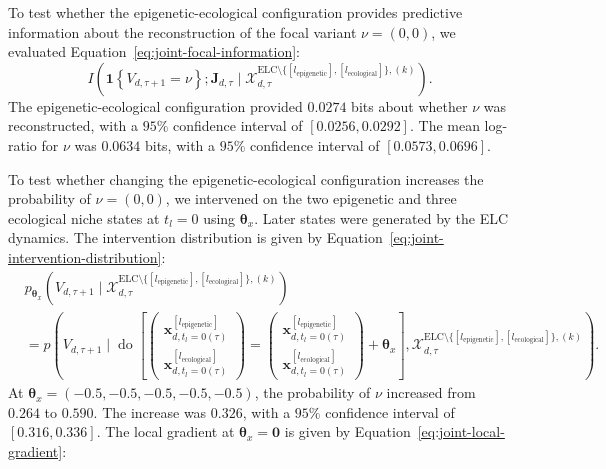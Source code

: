 \documentclass[11pt]{article}
\newcommand{\ELC}{\mathrm{ELC}}
\begin{document}
To test whether the epigenetic-ecological configuration provides predictive information about the reconstruction of the focal variant $\nu=(0,0)$, we evaluated Equation~\ref{eq:joint-focal-information}:
\begin{equation}
I\left(
\mathbf{1}\left\{V_{d,\tau+1}=\nu\right\};
\mathbf{J}_{d,\tau}
\mid
\mathcal{X}^{\ELC\setminus
\{[l_{\mathrm{epigenetic}}],[l_{\mathrm{ecological}}]\},(k)}_{d,\tau}
\right).
\label{eq:joint-focal-information}
\end{equation}
The epigenetic-ecological configuration provided $0.0274$ bits about whether $\nu$ was reconstructed, with a $95\%$ confidence interval of $[0.0256,0.0292]$. The mean log-ratio for $\nu$ was $0.0634$ bits, with a $95\%$ confidence interval of $[0.0573,0.0696]$.

To test whether changing the epigenetic-ecological configuration increases the probability of $\nu=(0,0)$, we intervened on the two epigenetic and three ecological niche states at $t_l=0$ using $\boldsymbol{\theta}_x$. Later states were generated by the ELC dynamics. The intervention distribution is given by Equation~\ref{eq:joint-intervention-distribution}:
\begin{equation}
\begin{aligned}
&p_{\boldsymbol{\theta}_x}\left(
V_{d,\tau+1}
\mid
\mathcal{X}^{\ELC\setminus
\{[l_{\mathrm{epigenetic}}],[l_{\mathrm{ecological}}]\},(k)}_{d,\tau}
\right)
\\
&=
p\left(
V_{d,\tau+1}
\mid
\operatorname{do}\left[
\begin{pmatrix}
\mathbf{x}^{[l_{\mathrm{epigenetic}}]}_{d,t_l=0(\tau)}\\
\mathbf{x}^{[l_{\mathrm{ecological}}]}_{d,t_l=0(\tau)}
\end{pmatrix}
=
\begin{pmatrix}
\mathbf{x}^{[l_{\mathrm{epigenetic}}]}_{d,t_l=0(\tau)}\\
\mathbf{x}^{[l_{\mathrm{ecological}}]}_{d,t_l=0(\tau)}
\end{pmatrix}
+
\boldsymbol{\theta}_x
\right],
\mathcal{X}^{\ELC\setminus
\{[l_{\mathrm{epigenetic}}],[l_{\mathrm{ecological}}]\},(k)}_{d,\tau}
\right).
\end{aligned}
\label{eq:joint-intervention-distribution}
\end{equation}
At $\boldsymbol{\theta}_x=(-0.5,-0.5,-0.5,-0.5,-0.5)$, the probability of $\nu$ increased from $0.264$ to $0.590$. The increase was $0.326$, with a $95\%$ confidence interval of $[0.316,0.336]$. The local gradient at $\boldsymbol{\theta}_x=\mathbf{0}$ is given by Equation~\ref{eq:joint-local-gradient}:
\end{document}
